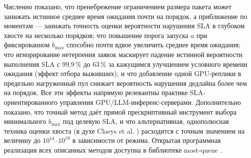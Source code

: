 \documentclass[12pt,a4paper]{article}
\newcommand{\articlesection}[1]{\par\vspace{14pt}{\bfseries #1}\par\vspace{6pt}\nopagebreak}
\begin{document}
Численно показано, что пренебрежение ограничением размера пакета может занижать истинное среднее время ожидания почти на порядок, а приближение по моментам --- занижать точность оценки вероятности нарушения SLA в глубоком хвосте на несколько порядков; что повышение порога запуска $a$ при фиксированном $b_{\max}$ способно почти вдвое увеличить среднее время ожидания; что игнорирование нетерпения заявок маскирует падение истинной вероятности выполнения SLA с 99,9\,\% до 63\,\% за кажущимся улучшением условного времени ожидания (эффект отбора выживших); и что добавление одной GPU-реплики в предельно нагруженный пул снижает вероятность нарушения дедлайна более чем на порядок. Все эти эффекты напрямую релевантны практике SLA-ориентированного управления GPU/LLM-инференс-серверами. Дополнительно показано, что точный метод даёт прямой прескриптивный инструмент выбора минимального $b_{\max}$ под целевую SLA, и что альтернативная, однополюсная техника оценки хвоста (в духе Claeys et al. \cite{claeys2013}) расходится с точным значением на величину до $10^{14}$--$10^{19}$ в зависимости от режима. Открытая программная реализация всех описанных методов доступна в библиотеке most-queue \cite{mostqueue2026}.

\articlesection{Список литературы}
\printbibliography[heading=none]
\end{document}
